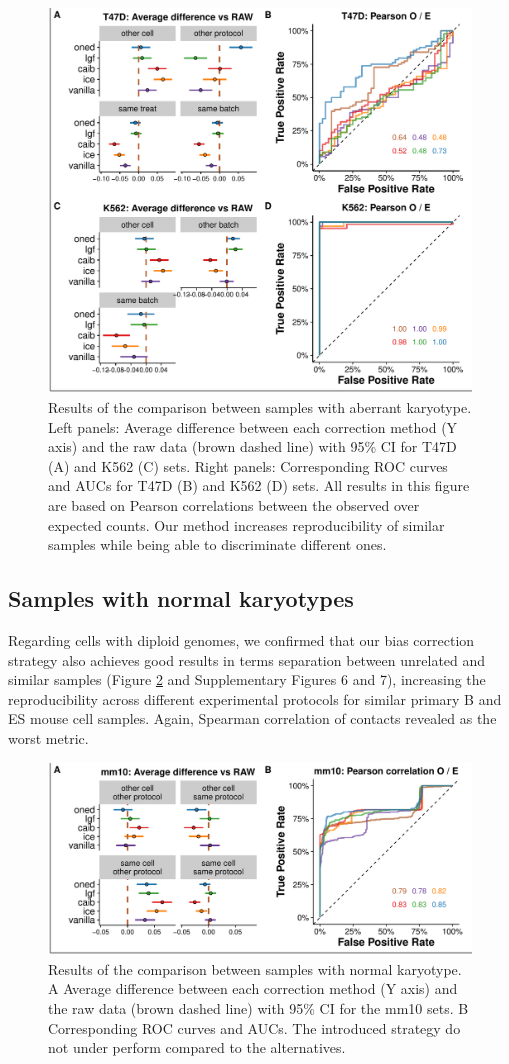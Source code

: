 \documentclass{bioinfo}
\begin{document}
\begin{figure}
	\centerline{\includegraphics[width=.50\textwidth]{img/correlation_aberrant_figure3.pdf}}
	\caption{
		Results of the comparison between samples with aberrant karyotype. Left panels: Average difference between each correction method (Y axis) and the raw data (brown dashed line) with 95\% CI for T47D (A) and K562 (C) sets. Right panels: Corresponding ROC curves and AUCs for T47D (B) and K562 (D) sets. All results in this figure are based on Pearson correlations between the observed over expected counts. Our method increases reproducibility of similar samples while being able to discriminate different ones.
	}\label{fig:aberrant}
\end{figure}


\subsection{Samples with normal karyotypes}

Regarding cells with diploid genomes, we confirmed that our bias correction strategy also achieves good results in terms separation between unrelated and similar samples (Figure \ref{fig:normal} and Supplementary Figures 6 and 7), increasing the reproducibility across different experimental protocols for similar primary B and ES mouse cell samples. Again, Spearman correlation of contacts revealed as the worst metric.

\begin{figure}
	\centerline{\includegraphics[width=.50\textwidth]{img/correlation_normal_figure4.pdf}}
	\caption{
		Results of the comparison between samples with normal karyotype. A Average difference between each correction method (Y axis) and the raw data (brown dashed line) with 95\% CI for the mm10 sets. B Corresponding ROC curves and AUCs. The introduced strategy do not under perform compared to the alternatives.
	}\label{fig:normal}
\end{figure}
\end{document}
